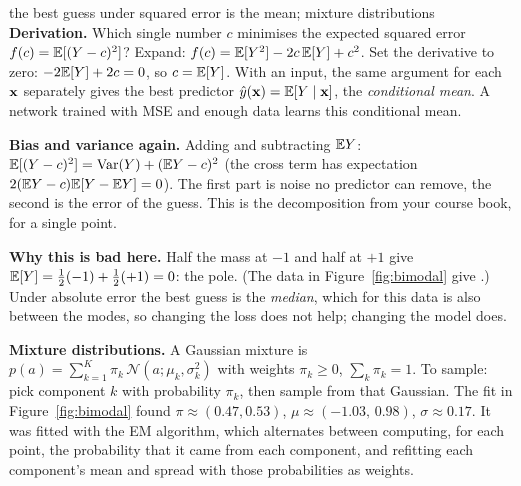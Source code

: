 \begin{probbox}{the best guess under squared error is the mean; mixture distributions}
\textbf{Derivation.} Which single number $c$ minimises the expected squared error $f(c)=\mathbb{E}[(Y-c)^2]$? Expand: $f(c)=\mathbb{E}[Y^2]-2c\,\mathbb{E}[Y]+c^2$. Set the derivative to zero: $-2\mathbb{E}[Y]+2c=0$, so $c=\mathbb{E}[Y]$. With an input, the same argument for each $\mathbf{x}$ separately gives the best predictor $\hat y(\mathbf{x})=\mathbb{E}[Y\mid\mathbf{x}]$, the \emph{conditional mean}. A network trained with MSE and enough data learns this conditional mean.

\textbf{Bias and variance again.} Adding and subtracting $\mathbb{E} Y$: $\mathbb{E}[(Y-c)^2]=\mathrm{Var}(Y)+(\mathbb{E} Y-c)^2$ (the cross term has expectation $2(\mathbb{E} Y-c)\mathbb{E}[Y-\mathbb{E} Y]=0$). The first part is noise no predictor can remove, the second is the error of the guess. This is the decomposition from your course book, for a single point.

\textbf{Why this is bad here.} Half the mass at $-1$ and half at $+1$ give $\mathbb{E}[Y]=\tfrac12(-1)+\tfrac12(+1)=0$: the pole. (The data in Figure~\ref{fig:bimodal} give \bimean.) Under absolute error the best guess is the \emph{median}, which for this data is also between the modes, so changing the loss does not help; changing the model does.

\textbf{Mixture distributions.} A Gaussian mixture is $p(a)=\sum_{k=1}^K\pi_k\,\mathcal N(a;\mu_k,\sigma_k^2)$ with weights $\pi_k\ge0$, $\sum_k\pi_k=1$. To sample: pick component $k$ with probability $\pi_k$, then sample from that Gaussian. The fit in Figure~\ref{fig:bimodal} found $\pi\approx(0.47,0.53)$, $\mu\approx(-1.03,\,0.98)$, $\sigma\approx0.17$. It was fitted with the EM algorithm, which alternates between computing, for each point, the probability that it came from each component, and refitting each component's mean and spread with those probabilities as weights.
\end{probbox}

